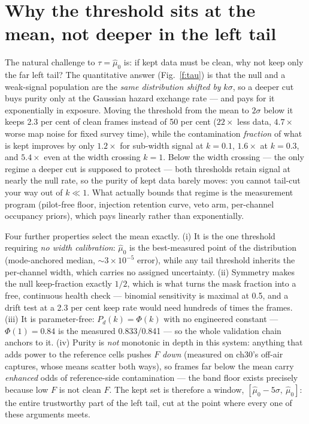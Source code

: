 \documentclass[10pt]{article}
\begin{document}
\section{Why the threshold sits at the mean, not deeper in the left tail}
\label{s:tau}
The natural challenge to $\tau = \hat\mu_0$ is: if kept data must be
clean, why not keep only the far left tail? The quantitative answer
(Fig.~\ref{f:tau}) is that the null and a weak-signal population are
the \emph{same distribution shifted by} $k\sigma$, so a deeper cut
buys purity only at the Gaussian hazard exchange rate --- and pays for
it exponentially in exposure. Moving the threshold from the mean to
$2\sigma$ below it keeps 2.3 per cent of clean frames instead of 50
per cent ($22\times$ less data, $4.7\times$ worse map noise for fixed
survey time), while the contamination \emph{fraction} of what is kept
improves by only $1.2\times$ for sub-width signal at $k=0.1$,
$1.6\times$ at $k=0.3$, and $5.4\times$ even at the width crossing
$k=1$. Below the width crossing --- the only regime a deeper cut is
supposed to protect --- both thresholds retain signal at nearly the
null rate, so the purity of kept data barely moves: you cannot
tail-cut your way out of $k \ll 1$. What actually bounds that regime
is the measurement program (pilot-free floor, injection retention
curve, veto arm, per-channel occupancy priors), which pays linearly
rather than exponentially.

Four further properties select the mean exactly. (i) It is the one
threshold requiring \emph{no width calibration}: $\hat\mu_0$ is the
best-measured point of the distribution (mode-anchored median,
$\sim 3\times10^{-5}$ error), while any tail threshold inherits the
per-channel width, which carries no assigned uncertainty. (ii)
Symmetry makes the null keep-fraction exactly $1/2$, which is what
turns the mask fraction into a free, continuous health check ---
binomial sensitivity is maximal at 0.5, and a drift test at a 2.3 per
cent keep rate would need hundreds of times the frames. (iii) It is
parameter-free: $P_d(k) = \Phi(k)$ with no engineered constant ---
$\Phi(1) = 0.84$ is the measured 0.833/0.841 --- so the whole
validation chain anchors to it. (iv) Purity is \emph{not} monotonic
in depth in this system: anything that adds power to the reference
cells pushes $F$ \emph{down} (measured on ch30's off-air captures,
whose means scatter both ways), so frames far below the mean carry
\emph{enhanced} odds of reference-side contamination --- the band
floor exists precisely because low $F$ is not clean $F$. The kept set
is therefore a window, $[\hat\mu_0 - 5\sigma,\ \hat\mu_0]$: the
entire trustworthy part of the left tail, cut at the point where
every one of these arguments meets.
\end{document}
